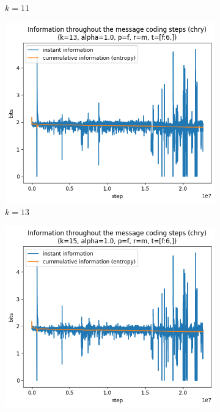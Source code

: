 \documentclass{article}
\begin{document}
\begin{figure}
\begin{subfigure}[b]{0.3\textwidth}
\begin{center}
        \end{center}
        \caption{$k = 11$}
        \label{fig:results-pattern-size-11}
    \end{subfigure}
    \hfill
    \begin{subfigure}[b]{0.3\textwidth}
        \begin{center}
            \includegraphics[width=1.0\linewidth]{../scripts/images/chry_13_1.0_f_m_[f:6,].png}
        \end{center}
        \caption{$k = 13$}
        \label{fig:results-pattern-size-13}
    \end{subfigure}
    \hfill
    \begin{subfigure}[b]{0.3\textwidth}
        \begin{center}
            \includegraphics[width=1.0\linewidth]{../scripts/images/chry_15_1.0_f_m_[f:6,].png}

\end{center}
\end{subfigure}
\end{figure}
\end{document}
